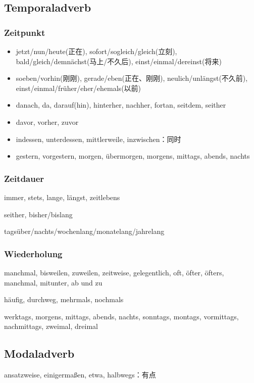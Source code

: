 \documentclass[UTF8]{report}
\begin{document}
\subsection{Temporaladverb}
\subsubsection{Zeitpunkt}

\begin{itemize}
    \item jetzt/nun/heute(正在), sofort/sogleich/gleich(立刻), bald/gleich/demnächst(马上/不久后), einst/einmal/dereinst(将来)
    
    \item soeben/vorhin(刚刚), gerade/eben(正在、刚刚), neulich/unlängst(不久前), einst/einmal/früher/eher/ehemals(以前)
    \item danach, da, darauf(hin), hinterher, nachher, fortan, seitdem, seither
    \item davor, vorher, zuvor
    \item indessen, unterdessen, mittlerweile, inzwischen：同时
    \item gestern, vorgestern, morgen, übermorgen, morgens, mittags, abends, nachts
\end{itemize}

\subsubsection{Zeitdauer}
immer, stets, lange, längst, zeitlebens

seither, bisher/bislang

tagsüber/nachts/wochenlang/monatelang/jahrelang

\subsubsection{Wiederholung}
manchmal, bisweilen, zuweilen, zeitweise, gelegentlich, oft, öfter, öfters, manchmal, mitunter, ab und zu

häufig, durchweg, mehrmals, nochmals

werktags, morgens, mittags, abends, nachts, sonntags, montags, vormittags, nachmittags, zweimal, dreimal


\subsection{Modaladverb}
ansatzweise, einigermaßen, etwa, halbwegs：有点
\end{document}
